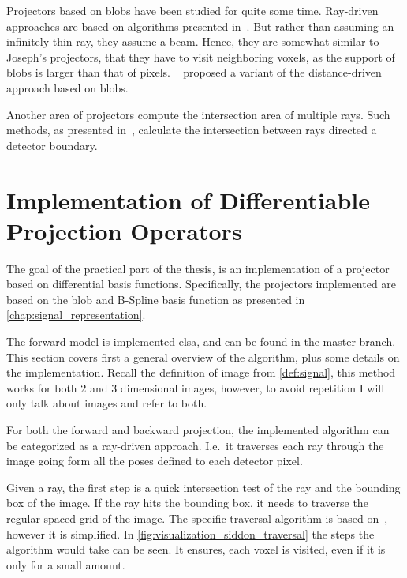 Projectors based on blobs have been studied for quite some time. Ray-driven approaches are based on
algorithms presented in~\cite{matej_practical_1996, popescu_ray_2004}. But rather than assuming an
infinitely thin ray, they assume a beam. Hence, they are somewhat similar to Joseph's projectors,
that they have to visit neighboring voxels, as the support of blobs is larger than that of pixels.
~\cite{levakhina_distance-driven_2010} proposed a variant of the distance-driven approach based on
blobs.

Another area of projectors compute the intersection area of multiple rays. Such methods, as
presented in~\cite{ha_study_2015, ha_efficient_2016, ha_look-up_2018}, calculate the intersection
between rays directed a detector boundary.

\section{Implementation of Differentiable Projection Operators}\label{sec:implementation}

The goal of the practical part of the thesis, is an implementation of a projector based on
differential basis functions. Specifically, the projectors implemented are based on the blob and
B-Spline basis function as presented in \autoref{chap:signal_representation}.

The forward model is implemented elsa, and can be found in the master branch. This section covers
first a general overview of the algorithm, plus some details on the implementation. Recall the
definition of image from \autoref{def:signal}, this method works for both \(2\) and \(3\) dimensional
images, however, to avoid repetition I will only talk about images and refer to both.

For both the forward and backward projection, the implemented algorithm can be categorized as a
ray-driven approach. I.e.\ it traverses each ray through the image going form all the poses defined
to each detector pixel.

Given a ray, the first step is a quick intersection test of the ray and the bounding box of the
image. If the ray hits the bounding box, it needs to traverse the regular spaced grid of the image.
The specific traversal algorithm is based on~\cite{amanatides_fast_1987}, however it is simplified.
In \autoref{fig:visualization_siddon_traversal} the steps the algorithm would take can be seen. It
ensures, each voxel is visited, even if it is only for a small amount.

